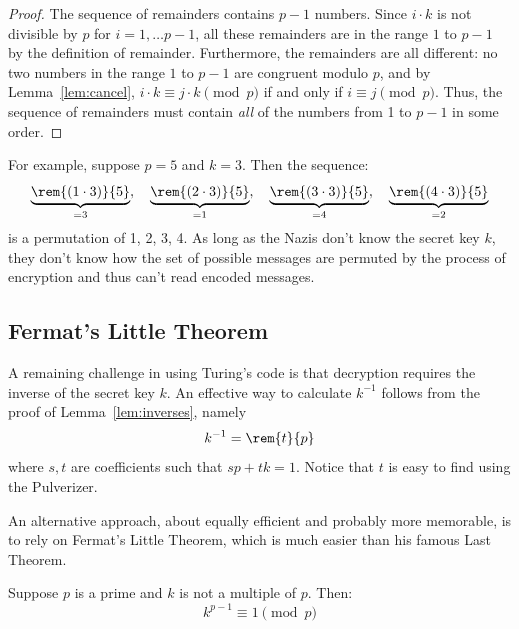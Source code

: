 \begin{proof}
The sequence of remainders contains $p-1$ numbers.  Since $i \cdot k$
is not divisible by $p$ for $i=1,\dots p-1$, all these remainders are
in the range $1$ to $p - 1$ by the definition of remainder.
Furthermore, the remainders are all different: no two numbers in the
range $1$ to $p - 1$ are congruent modulo $p$, and by
Lemma~\ref{lem:cancel}, $i \cdot k \equiv j \cdot k \pmod{p}$ if and
only if $i \equiv j \pmod{p}$.  Thus, the sequence of remainders must
contain \emph{all} of the numbers from 1 to $p - 1$ in some order.
\end{proof}

For example, suppose $p = 5$ and $k = 3$.  Then the sequence:
%
\[
\underbrace{\rem{(1 \cdot 3)}{5}}_{=3},\quad
\underbrace{\rem{(2 \cdot 3)}{5}}_{=1},\quad
\underbrace{\rem{(3 \cdot 3)}{5}}_{=4},\quad
\underbrace{\rem{(4 \cdot 3)}{5}}_{=2}
\]
%
is a permutation of
1, 2, 3, 4.  As long as the Nazis don't know the secret key
$k$, they don't know how the set of possible messages are permuted by the
process of encryption and thus can't read encoded messages.


\subsection{Fermat's Little Theorem}

A remaining challenge in using Turing's code is that decryption requires
the inverse of the secret key $k$.  An effective way to calculate
$k^{-1}$ follows from the proof of Lemma~\ref{lem:inverses}, namely
\[
k^{-1} = \rem{t}{p}
\]
where $s,t$ are coefficients such that $sp+tk=1$.  Notice that $t$ is
easy to find using the Pulverizer.

An alternative approach, about equally efficient and probably more
memorable, is to rely on Fermat's Little Theorem, which is much easier than his
famous Last Theorem.  

\begin{theorem}\label{fermat_little}
Suppose $p$ is a prime and $k$ is not a multiple of $p$.  Then:
%
\[
k^{p-1} \equiv 1 \pmod{p}
\]
\end{theorem}

